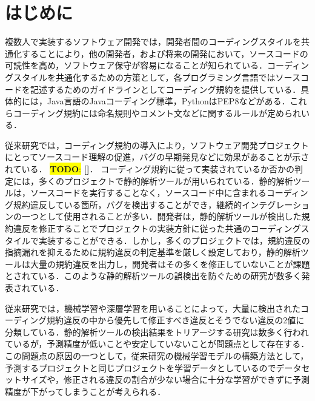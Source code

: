 \documentclass[T,J]{fose} %
\newcommand{\todo}[1]{\colorbox{yellow}{{\bf TODO}:}{\color{red} {\textbf{[#1]}}}}
\begin{document}
\section{はじめに}

複数人で実装するソフトウェア開発では，開発者間のコーディングスタイルを共通化することにより，他の開発者，および将来の開発において，ソースコードの可読性を高め，ソフトウェア保守が容易になることが知られている\cite{EffectsSAT}．コーディングスタイルを共通化するための方策として，各プログラミング言語ではソースコードを記述するためのガイドラインとしてコーディング規約を提供している．具体的には，Java言語のJavaコーディング標準，PythonはPEP8などがある．これらコーディング規約には命名規則やコメント文などに関するルールが定められいる．

従来研究では，コーディング規約の導入により，ソフトウェア開発プロジェクトにとってソースコード理解の促進，バグの早期発見などに効果があることが示されている．
\todo{\cite{}\cite{}\cite{}}．
コーディング規約に従って実装されているか否かの判定には，多くのプロジェクトで静的解析ツールが用いられている．静的解析ツールは，ソースコードを実行することなく，ソースコード中に含まれるコーディング規約違反している箇所，バグを検出することができ，継続的インテグレーションの一つとして使用されることが多い．開発者は，静的解析ツールが検出した規約違反を修正することでプロジェクトの実装方針に従った共通のコーディングスタイルで実装することができる．しかし，多くのプロジェクトでは，規約違反の指摘漏れを抑えるために規約違反の判定基準を厳しく設定しており，静的解析ツールは大量の規約違反を出力し，開発者はその多くを修正していないことが課題とされている．このような静的解析ツールの誤検出を防ぐための研究が数多く発表されている．

従来研究では，機械学習や深層学習を用いることによって，大量に検出されたコーディング規約違反の中から優先して修正すべき違反とそうでない違反の2値に分類している．静的解析ツールの検出結果をトリアージする研究は数多く行われているが，予測精度が低いことや安定していないことが問題点として存在する．この問題点の原因の一つとして，従来研究の機械学習モデルの構築方法として，予測するプロジェクトと同じプロジェクトを学習データとしているのでデータセットサイズや，修正される違反の割合が少ない場合に十分な学習ができずに予測精度が下がってしまうことが考えられる．
\end{document}
